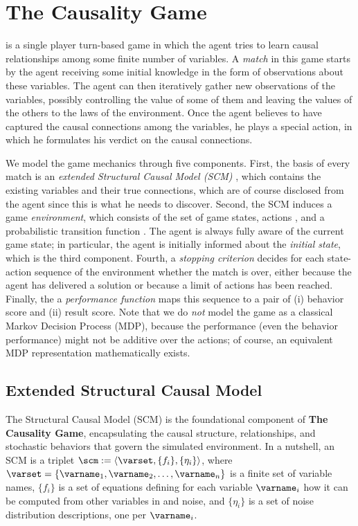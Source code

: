 \documentclass{uai2024} %
\begin{document}
\section{The Causality Game}
    \game is a single player turn-based game in which the agent tries to learn causal relationships among some finite number of variables.
    A \emph{match} in this game starts by the agent receiving some initial knowledge in the form of observations about these variables.
    The agent can then iteratively gather new observations of the variables, possibly controlling the value of some of them and  leaving the values of the others to the laws of the environment.
    Once the agent believes to have captured the causal connections among the variables, he plays a special action, in which he formulates his verdict on the causal connections.

    We model the game mechanics through five components.
    First, the basis of every match is an \emph{extended Structural Causal Model (SCM)} \scm \citep{pearl}, which contains the existing variables and their true connections, which are of course disclosed from the agent since this is what he needs to discover.
    Second, the SCM induces a game \emph{environment}, which consists of the set \statespace of game states, actions \actionspace, and a probabilistic transition function \transition.
    The agent is always fully aware of the current game state; in particular, the agent is initially informed about the \emph{initial state}, which is the third component.
    Fourth, a \emph{stopping criterion} decides for each state-action sequence of the environment whether the match is over, either because the agent has delivered a solution or because a limit of actions has been reached.
    Finally, the a \emph{performance function} maps this sequence to a pair of (i) behavior score and (ii) result score.
    Note that we do \emph{not} model the game as a classical Markov Decision Process (MDP), because the performance (even the behavior performance) might not be additive over the actions; of course, an equivalent MDP representation mathematically exists.


    \subsection{Extended Structural Causal Model}
        The Structural Causal Model (SCM) \scm is the foundational component of \textbf{The Causality Game}, encapsulating the causal structure, relationships, and stochastic behaviors that govern the simulated environment.
        In a nutshell, an SCM is a triplet $\scm := \langle \varset, \{f_i\}, \{\eta_i\}\rangle$,
        where $ \varset = \{\varname_1, \varname_2, \ldots, \varname_n\} $ is a finite set of variable names, 
        $\{f_i\}$ is a set of equations defining for each variable $\varname_i$ how it can be computed from other variables in \varset and noise, and $\{\eta_i\}$ is a set of noise distribution descriptions, one per $\varname_i$.
        
\end{document}
